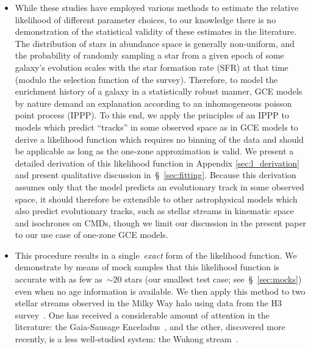 \documentclass[ms.tex]{subfiles}
\begin{document}
\begin{itemize}
	\item While these studies have employed various methods to estimate the
	relative likelihood of different parameter choices, to our knowledge there
	is no demonstration of the statistical validity of these estimates in the
	literature.
	The distribution of stars in abundance space is generally non-uniform, and
	the probability of randomly sampling a star from a given epoch of some
	galaxy's evolution scales with the star formation rate (SFR) at that time
	(modulo the selection function of the survey).
	Therefore, to model the enrichment history of a galaxy in a statistically
	robust manner, GCE models by nature demand an explanation according to an
	inhomogeneous poisson point process (IPPP).
	To this end, we apply the principles of an IPPP to models which predict
	``tracks'' in some observed space as in GCE models to derive a likelihood
	function which requires no binning of the data and should be applicable as
	long as the one-zone approximation is valid.
	We present a detailed derivation of this likelihood function in Appendix
	\ref{sec:l_derivation} and present qualitative discussion
	in~\S~\ref{sec:fitting}.
	Because this derivation assumes only that the model predicts an
	evolutionary track in some observed space, it should therefore be
	extensible to other astrophysical models which also predict evolutionary
	tracks, such as stellar streams in kinematic space and isochrones on CMDs,
	though we limit our discussion in the present paper to our use case of
	one-zone GCE models.

	\item This procedure results in a single~\textit{exact} form of the
	likelihood function.
	We demonstrate by means of mock samples that this likelihood function is
	accurate with as few as~$\sim$20 stars (our smallest test case;
	see~\S~\ref{sec:mocks}) even when no age information is available.
	We then apply this method to two stellar streams observed in the Milky Way
	halo using data from the H3 survey~\citep{Conroy2019}.
	One has received a considerable amount of attention in the literature: the
	Gaia-Sausage Enceladus~\citep[GSE;][]{Belokurov2018, Helmi2018}, and
	the other, discovered more recently, is a less well-studied system: the
	Wukong stream~\citep{Naidu2020, Naidu2022}.



\end{itemize}
\end{document}
